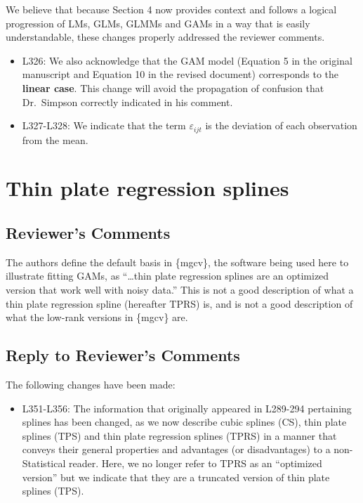 \documentclass[
]{article}
\providecommand{\tightlist}{%
  \setlength{\itemsep}{0pt}\setlength{\parskip}{0pt}}
\begin{document}
We believe that because Section 4 now provides context and follows a logical progression of LMs, GLMs, GLMMs and GAMs in a way that is easily understandable, these changes properly addressed the reviewer comments.

\begin{itemize}
\item
  L326: We also acknowledge that the GAM model (Equation 5 in the original manuscript and Equation 10 in the revised document) corresponds to the \textbf{linear case}. This change will avoid the propagation of confusion that Dr.~Simpson correctly indicated in his comment.
\item
  L327-L328: We indicate that the term \(\varepsilon_{ijt}\) is the deviation of each observation from the mean.
\end{itemize}

\hypertarget{thin-plate-regression-splines}{%
\section{Thin plate regression splines}\label{thin-plate-regression-splines}}

\hypertarget{reviewers-comments-3}{%
\subsection{Reviewer's Comments}\label{reviewers-comments-3}}

The authors define the default basis in \{mgcv\}, the software being used here to illustrate fitting GAMs, as ``\ldots thin plate regression splines are an optimized version that work well with noisy data.'' This is not a good description of what a thin plate regression spline (hereafter TPRS) is, and is not a good description of what the low-rank versions in \{mgcv\} are.

\hypertarget{section-4}{%
\subsection{\texorpdfstring{\textcolor{reviewersblue} {Reply to Reviewer's Comments}}{}}\label{section-4}}

The following changes have been made:

\begin{itemize}
\tightlist
\item
  L351-L356: The information that originally appeared in L289-294 pertaining splines has been changed, as we now describe cubic splines (CS), thin plate splines (TPS) and thin plate regression splines (TPRS) in a manner that conveys their general properties and advantages (or disadvantages) to a non-Statistical reader. Here, we no longer refer to TPRS as an ``optimized version'' but we indicate that they are a truncated version of thin plate splines (TPS).
\end{itemize}
\end{document}
